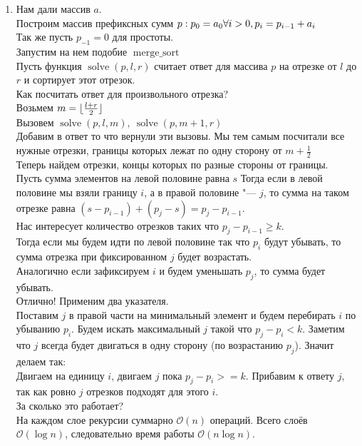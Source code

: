 \documentclass[a4paper, 10pt]{article}
\DeclarePairedDelimiter\floor{\lfloor}{\rfloor}
\begin{document}
\begin{enumerate}
    \item{
        Нам дали массив $a$.\\
        Построим массив префиксных сумм $p:\\
        p_0 = a_0\\
        \forall i > 0, p_i = p_{i-1} + a_i$\\
        Так же пусть $p_{-1} = 0$ для простоты.\\
        Запустим на нем подобие $\operatorname{merge\_sort}$\\
        Пусть функция $\operatorname{solve}(p, l, r)$ считает ответ для массива $p$ на отрезке от $l$ до $r$ и сортирует этот отрезок.\\
        Как посчитать ответ для произвольного отрезка?\\
        Возьмем $m = \floor{\frac{l + r}{2}}$\\
        Вызовем $\operatorname{solve}(p, l, m), \medspace \operatorname{solve}(p, m + 1, r)$\\
        Добавим в ответ то что вернули эти вызовы. Мы тем самым посчитали все нужные отрезки, границы которых лежат по одну сторону от $m + \frac{1}{2}$\\
        Теперь найдем отрезки, концы которых по разные стороны от границы.\\
        Пусть сумма элементов на левой половине равна $s$
        Тогда если в левой половине мы взяли границу $i$, а в правой половине "--- $j$, то сумма на таком отрезке равна $(s - p_{i - 1}) + (p_j - s) = p_j - p_{i - 1}$.\\
        Нас интересует количество отрезков таких что $p_j - p_{i - 1} \geq k$.\\
        Тогда если мы будем идти по левой половине так что $p_i$ будут убывать, то сумма отрезка при фиксированном $j$ будет возрастать.\\
        Аналогично если зафиксируем $i$ и будем уменьшать $p_j$, то сумма будет убывать.\\
        Отлично! Применим два указателя.\\
        Поставим $j$ в правой части на минимальный элемент и будем перебирать $i$ по убыванию $p_i$. Будем искать максимальный $j$ такой что $p_j - p_i < k$. Заметим что $j$ всегда будет двигаться в одну сторону (по возрастанию $p_j$). Значит делаем так:\\
        Двигаем на единицу $i$, двигаем $j$ пока $p_j - p_i >= k$. Прибавим к ответу $j$, так как ровно $j$ отрезков подходят для этого $i$.\\
        За сколько это работает?\\
        На каждом слое рекурсии суммарно $\mathcal{O}(n)$ операций. Всего слоёв $\mathcal{O}(\log{n})$, следовательно время работы $\mathcal{O}(n\log{n})$.
    }

\end{enumerate}
\end{document}
